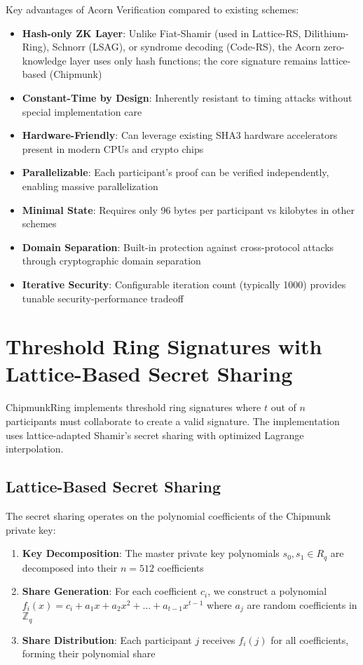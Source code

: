 \documentclass[11pt,a4paper]{article}
\begin{document}
Key advantages of Acorn Verification compared to existing schemes:

\begin{itemize}
\item \textbf{Hash-only ZK Layer}: Unlike Fiat-Shamir (used in Lattice-RS, Dilithium-Ring), Schnorr (LSAG), or syndrome decoding (Code-RS), the Acorn zero-knowledge layer uses only hash functions; the core signature remains lattice-based (Chipmunk)
\item \textbf{Constant-Time by Design}: Inherently resistant to timing attacks without special implementation care
\item \textbf{Hardware-Friendly}: Can leverage existing SHA3 hardware accelerators present in modern CPUs and crypto chips
\item \textbf{Parallelizable}: Each participant's proof can be verified independently, enabling massive parallelization
\item \textbf{Minimal State}: Requires only 96 bytes per participant vs kilobytes in other schemes
\item \textbf{Domain Separation}: Built-in protection against cross-protocol attacks through cryptographic domain separation
\item \textbf{Iterative Security}: Configurable iteration count (typically 1000) provides tunable security-performance tradeoff
\end{itemize}

\section{Threshold Ring Signatures with Lattice-Based Secret Sharing}

ChipmunkRing implements threshold ring signatures where $t$ out of $n$ participants must collaborate to create a valid signature. The implementation uses lattice-adapted Shamir's secret sharing with optimized Lagrange interpolation.

\subsection{Lattice-Based Secret Sharing}

The secret sharing operates on the polynomial coefficients of the Chipmunk private key:

\begin{enumerate}
\item \textbf{Key Decomposition}: The master private key polynomials $s_0, s_1 \in R_q$ are decomposed into their $n = 512$ coefficients
\item \textbf{Share Generation}: For each coefficient $c_i$, we construct a polynomial $f_i(x) = c_i + a_1x + a_2x^2 + \ldots + a_{t-1}x^{t-1}$ where $a_j$ are random coefficients in $\mathbb{Z}_q$
\item \textbf{Share Distribution}: Each participant $j$ receives $f_i(j)$ for all coefficients, forming their polynomial share
\end{enumerate}
\end{document}
